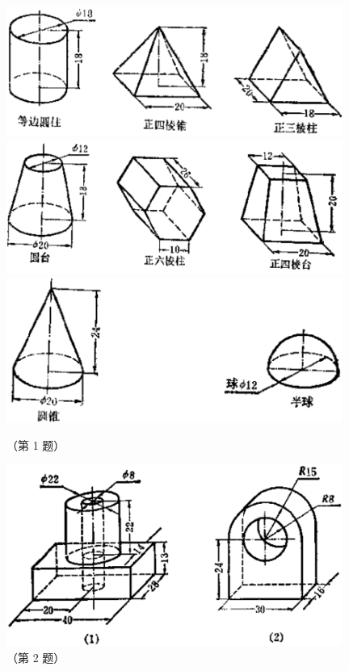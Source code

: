 \xiti
\begin{xiaotis}


\begin{figure}[htbp]
    \centering
    \includegraphics[width=11cm]{../pic/czjh2-ch8-xiti30-01-1.png}
    \includegraphics[width=11cm]{../pic/czjh2-ch8-xiti30-01-2.png}
    \includegraphics[width=11cm]{../pic/czjh2-ch8-xiti30-01-3.png}
    \caption*{（第 1 题）}
\end{figure}



\begin{figure}[H]%
    \centering
    \includegraphics[width=11cm]{../pic/czjh2-ch8-xiti30-02.png}
    \caption*{（第 2 题）}
\end{figure}


\end{xiaotis}
